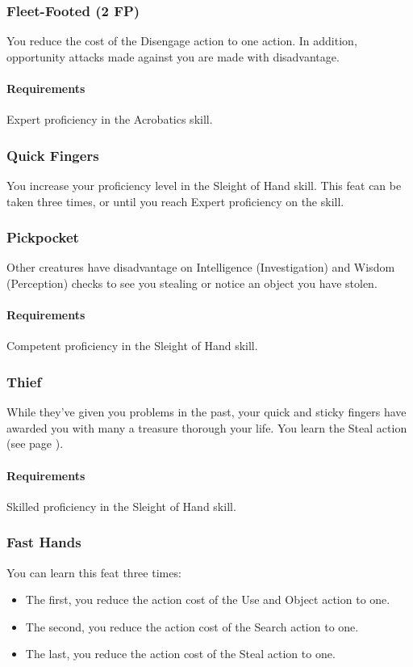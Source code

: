 \subsubsection{Fleet-Footed (2 FP)} \label{feat::fleetfooted}
    You reduce the cost of the Disengage action to one action.
    In addition, opportunity attacks made against you are made with disadvantage.
    \paragraph{Requirements} Expert proficiency in the Acrobatics skill.
\subsubsection{Quick Fingers} \label{feat::quickfingers}
    You increase your proficiency level in the Sleight of Hand skill.
    This feat can be taken three times, or until you reach Expert proficiency on the skill.
\subsubsection{Pickpocket} \label{feat::pickpocket}
    Other creatures have disadvantage on Intelligence (Investigation) and Wisdom (Perception) checks to see you stealing or notice an object you have stolen.
    \paragraph{Requirements} Competent proficiency in the Sleight of Hand skill.
\subsubsection{Thief} \label{feat::thief}
    While they've given you problems in the past, your quick and sticky fingers have awarded you with many a treasure thorough your life.
    You learn the Steal action (see page \pageref{act::steal}).
    \paragraph{Requirements} Skilled proficiency in the Sleight of Hand skill.
\subsubsection{Fast Hands} \label{feat::fasthands}
    You can learn this feat three times:
    \begin{itemize}
        \item The first, you reduce the action cost of the Use and Object action to one.
        \item The second, you reduce the action cost of the Search action to one.
        \item The last, you reduce the action cost of the Steal action to one.
    \end{itemize}
